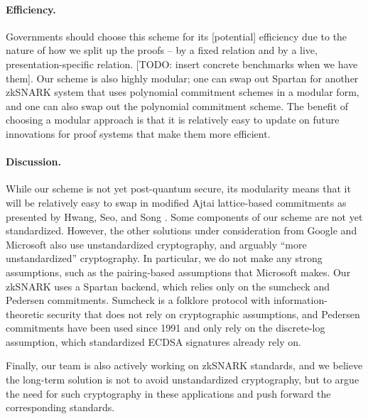 \paragraph{Efficiency.} Governments should choose this scheme for its [potential] efficiency due to the nature of how we split up the proofs – by a fixed relation and by a live, presentation-specific relation.
[TODO: insert concrete benchmarks when we have them].
Our scheme is also highly modular; one can swap out Spartan for another zkSNARK system that uses polynomial commitment schemes in a modular form, and one can also swap out the polynomial commitment scheme. 
The benefit of choosing a modular approach is that it is relatively easy to update on future innovations for proof systems that make them more efficient.

\paragraph{Discussion.} While our scheme is not yet post-quantum secure, its modularity means that it will be relatively easy to swap in modified Ajtai lattice-based commitments as presented by Hwang, Seo, and Song \cite{cryptoeprint:2024/306}.
Some components of our scheme are not yet standardized. However, the other solutions under consideration from Google and Microsoft also use unstandardized cryptography, and arguably ``more unstandardized'' cryptography. 
In particular, we do not make any strong assumptions, such as the pairing-based assumptions that Microsoft makes.
Our zkSNARK uses a Spartan backend, which relies only on the sumcheck and Pedersen commitments.
Sumcheck is a folklore protocol with information-theoretic security that does not rely on cryptographic assumptions, and Pedersen commitments have been used since 1991 \cite{C:Pedersen91} and only rely on the discrete-log assumption, which standardized ECDSA signatures already rely on. 

Finally, our team is also actively working on zkSNARK standards, and we believe the long-term solution is not to avoid unstandardized cryptography, but to argue the need for such cryptography in these applications and push forward the corresponding standards. 


